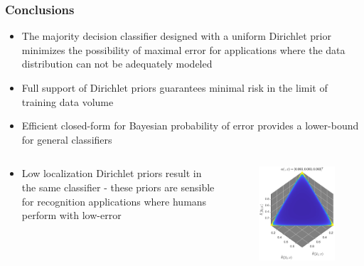 \documentclass[aspectratio=169]{beamer}
\begin{document}
\begin{frame}
\begin{columns}[c]
\begin{column}{.5\linewidth}
\end{column}

\end{columns}

\end{frame}





\begin{frame}
\frametitle{Conclusions}

\begin{itemize}
\item The majority decision classifier designed with a uniform Dirichlet prior minimizes the possibility of maximal error for applications where the data distribution can not be adequately modeled
\item Full support of Dirichlet priors guarantees minimal risk in the limit of training data volume
\item Efficient closed-form for Bayesian probability of error provides a lower-bound for general classifiers
\end{itemize}

\begin{columns}[T]

\begin{column}{.55\linewidth}

\begin{itemize}
\item Low localization Dirichlet priors result in the same classifier - these priors are sensible for recognition applications where humans perform with low-error
\end{itemize}

\end{column}

\begin{column}{.4\linewidth}

\vspace{-2em}
\begin{figure}
\centering
\includegraphics[width=0.5\linewidth]{P_theta_highVar.pdf}
\label{fig:P_theta_highVar}
\end{figure}

\end{column}

\end{columns}


\end{frame}
\end{document}
